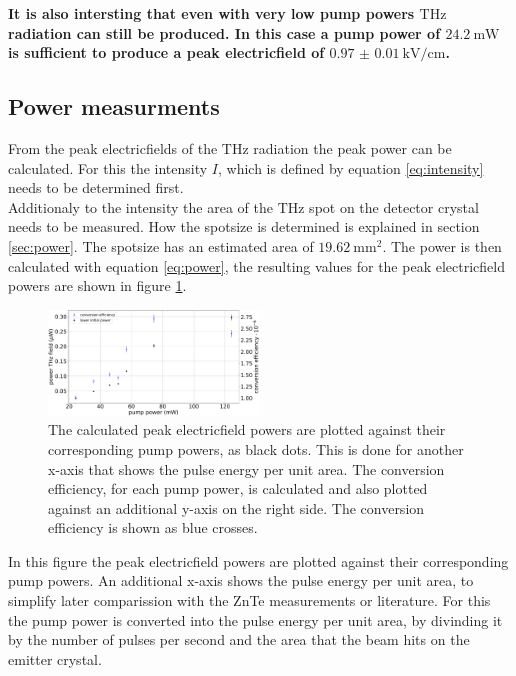 \textbf{It is also intersting that even with very low pump powers $\si{\tera\hertz}$ radiation can still be produced.
In this case a pump power of $\SI{24.2}{\milli\W}$ is sufficient to produce a peak electricfield of $\SI{0.97(1)}{\kilo\V\per\centi\meter}$.}
\FloatBarrier
\subsection{Power measurments}
From the peak electricfields of the $\si{\tera\hertz}$ radiation the peak power can be calculated.
For this the intensity $I$, which is defined by equation \ref{eq:intensity} needs to be determined first.
\\
Additionaly to the intensity the area of the $\si{\tera\hertz}$ spot on the detector crystal needs to be measured.
How the spotsize is determined is explained in section \ref{sec:power}.
The spotsize has an estimated area of $\SI{19.62}{\milli\meter\squared}$.
The power is then calculated with equation \ref{eq:power}, the resulting values for the peak electricfield powers are shown in figure \ref{fig:gap_power}.
\begin{figure}
    \centering
    \includegraphics[width=0.5\textwidth]{Plots/Powergap.pdf}
    \caption{The calculated peak electricfield powers are plotted against their corresponding pump powers, as black dots.
    This is done for another x-axis that shows the pulse energy per unit area.
    The conversion efficiency, for each pump power, is calculated and also plotted against an additional y-axis on the right side.
    The conversion efficiency is shown as blue crosses.}
    \label{fig:gap_power}
\end{figure}
In this figure the peak electricfield powers are plotted against their corresponding pump powers.
An additional x-axis shows the pulse energy per unit area, to simplify later comparission with the ZnTe measurements or literature.
For this the pump power is converted into the pulse energy per unit area, by divinding it by the number of pulses per second and the area that the beam hits on the emitter crystal.
\\\\

